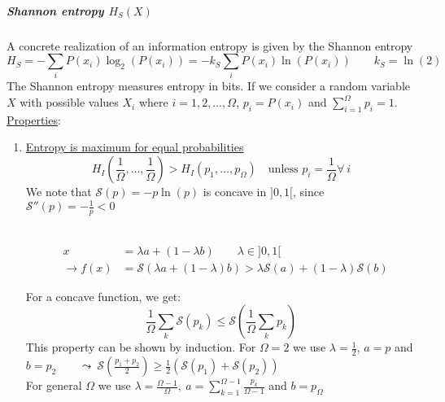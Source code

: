 \subparagraph{Shannon entropy $H_S(X)$} A concrete realization of an information entropy is given by the Shannon entropy
\begin{equation*}
	H_S=-\sum\limits_i P(x_i)\log_2(P(x_i))=-k_S\sum\limits_iP(x_i)\ln(P(x_i)) \qquad k_S=\ln(2)
\end{equation*}
The Shannon entropy measures entropy in bits. If we consider a random variable $X$ with possible values $X_i$ where $i=1,2,\ldots ,\Omega$, $p_i=P(x_i)$ and $\sum\limits_{i=1}^\Omega p_i=1$.\\
\underline{Properties}:
\begin{enumerate}[label={$(\arabic*)$}]
	\item \underline{Entropy is maximum for equal probabilities}
	\begin{equation*}
		H_I\left(\frac{1}{\Omega},\ldots,\frac{1}{\Omega}\right)>H_I(p_1,\ldots,p_\Omega) \quad \text{unless } p_i=\frac{1}{\Omega}\forall\ i
	\end{equation*}
	We note that $\mathcal{S}(p)=-p\ln(p)$ is concave in $]0,1[$, since $\mathcal{S}''(p)=-\frac{1}{p}<0$\\
\begin{figure}[H]
\begin{multicols}{2}
\\\columnbreak
\begin{align*}
x&=\lambda a+(1-\lambda b) \qquad \lambda\in ]0,1[\\
\to f(x)&=\mathcal{S}(\lambda a+(1-\lambda)b) > \lambda \mathcal{S}(a)+(1-\lambda)\mathcal{S}(b)
\end{align*}
\end{multicols}
\end{figure}
For a concave function, we get:
\begin{equation*}
\frac{1}{\Omega}\sum\limits_k\mathcal{S}(p_k)\leq \mathcal{S}\left(\frac{1}{\Omega}\sum\limits_kp_k\right)
\end{equation*}
This property can be shown by induction. For $\Omega=2$ we use $\lambda=\frac{1}{2}$, $a=p$ and $b=p_2\qquad \leadsto\ \mathcal{S}(\frac{p_1+p_2}{2})\geq\frac{1}{2}\left(\mathcal{S}(p_1)+\mathcal{S}(p_2)\right)$\\
For general $\Omega$ we use $\lambda=\frac{\Omega -1}{\Omega},\ a=\sum\limits_{k=1}^{\Omega -1}\frac{p_k}{\Omega -1}$ and $b=p_\Omega$

\end{enumerate}
